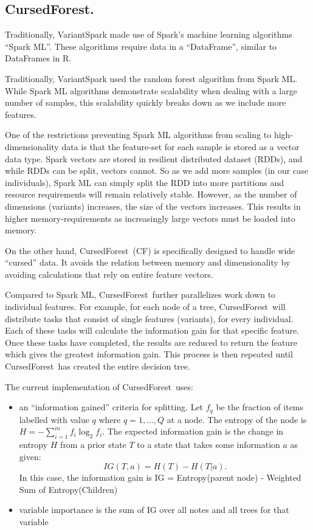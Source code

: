 \documentclass[10pt,letterpaper]{article}
\newcommand{\cursedforest}{{\sc CursedForest}}
\begin{document}
\subsection{\cursedforest.}
Traditionally, VariantSpark made use of Spark's machine learning algorithms ``Spark ML''. These algorithms require data
in a ``DataFrame'', similar to DataFrames in R.

Traditionally, VariantSpark used the random forest algorithm from Spark ML. While Spark ML algorithms demonstrate
scalability when dealing with a large number of samples, this scalability quickly breaks down as we include more
features.

One of the restrictions preventing Spark ML algorithms from scaling to high-dimensionality data is that the feature-set
for each sample is stored as a vector data type. Spark vectors are stored in resilient distributed dataset (RDDs), and
while RDDs can be split, vectors cannot. So as we add more samples (in our case individuals), Spark ML can simply split
the RDD into more partitions and resource requirements will remain relatively stable. However, as the number of
dimensions (variants) increases, the size of the vectors increases. This results in higher memory-requirements as
increasingly large vectors must be loaded into memory.

On the other hand, \cursedforest\ (CF) is specifically designed to handle wide ``cursed'' data. It avoids the relation
between memory and dimensionality by avoiding calculations that rely on entire feature vectors.

Compared to Spark ML, \cursedforest\ further parallelizes work down to individual features.  For example, for each node of
a tree, \cursedforest\ will distribute tasks that consist of single features (variants), for every individual.  Each of
these tasks will calculate the information gain for that specific feature.  Once these tasks have completed, the results
are reduced to return the feature which gives the greatest information gain.  This process is then repeated until
\cursedforest\ has created the entire decision tree.

The current implementation of \cursedforest\ uses:
\begin{itemize}
\item an ``information gained'' criteria for splitting. Let $f_q$ be the fraction of items labelled with value $q$ where $q = 1,
  \ldots, Q$ at a node. The entropy of the node is $H = - \sum^{m}_{i=1} f_i \log^{}_2 f_i.$
The expected information gain is the change in entropy $H$ from a prior state $T$ to a state that takes some
information $a$ as given: 
\[ IG(T,a) = H(T) - H(T|a). \]
In this case, the information gain is IG = Entropy(parent node) - Weighted Sum of Entropy(Children)
\item variable importance is the sum of IG over all notes and all trees for that variable
\end{itemize}
\end{document}
